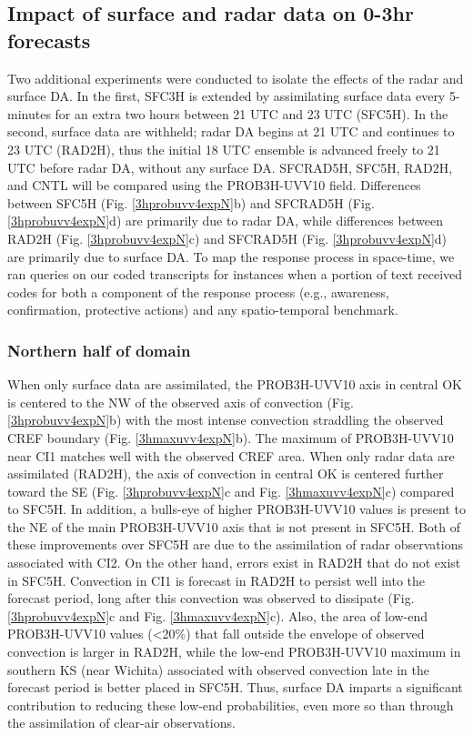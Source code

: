 \subsection{Impact of surface and radar data on 0-3hr forecasts}
Two additional experiments were conducted to isolate the effects of the radar and surface DA. In the first, SFC3H is extended by assimilating surface data every 5-minutes for an extra two hours between 21 UTC and 23 UTC (SFC5H). In the second, surface data are withheld; radar DA begins at 21 UTC and continues to 23 UTC (RAD2H), thus the initial 18 UTC ensemble is advanced freely to 21 UTC before radar DA, without any surface DA. SFCRAD5H, SFC5H, RAD2H, and CNTL will be compared using the PROB3H-UVV10 field. Differences between SFC5H (Fig. \ref{3hprobuvv4expN}b) and SFCRAD5H (Fig. \ref{3hprobuvv4expN}d) are primarily due to radar DA, while differences between RAD2H (Fig. \ref{3hprobuvv4expN}c) and SFCRAD5H (Fig. \ref{3hprobuvv4expN}d) are primarily due to surface DA. To map the response process in space-time, we ran queries on our coded transcripts for instances when a portion of text received codes for both a component of the response process (e.g., awareness, confirmation, protective actions) and any spatio-temporal benchmark.

\subsubsection{Northern half of domain}
When only surface data are assimilated, the PROB3H-UVV10 axis in central OK is centered to the NW of the observed axis of convection (Fig. \ref{3hprobuvv4expN}b) with the most intense convection straddling the observed CREF boundary (Fig. \ref{3hmaxuvv4expN}b). The maximum of PROB3H-UVV10 near CI1 matches well with the observed CREF area. When only radar data are assimilated (RAD2H), the axis of convection in central OK is centered further toward the SE (Fig. \ref{3hprobuvv4expN}c and Fig. \ref{3hmaxuvv4expN}c) compared to SFC5H. In addition, a bulls-eye of higher PROB3H-UVV10 values is present to the NE of the main PROB3H-UVV10 axis that is not present in SFC5H. Both of these improvements over SFC5H are due to the assimilation of radar observations associated with CI2. On the other hand, errors exist in RAD2H that do not exist in SFC5H. Convection in CI1 is forecast in RAD2H to persist well into the forecast period, long after this convection was observed to dissipate (Fig. \ref{3hprobuvv4expN}c and Fig. \ref{3hmaxuvv4expN}c). Also, the area of low-end PROB3H-UVV10 values (\textless 20\%) that fall outside the envelope of observed convection is larger in RAD2H, while the low-end PROB3H-UVV10 maximum in southern KS (near Wichita) associated with observed convection late in the forecast period is better placed in SFC5H. Thus, surface DA imparts a significant contribution to reducing these low-end probabilities, even more so than through the assimilation of clear-air observations.

